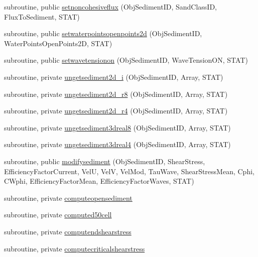 \begin{DoxyCompactItemize}
\item 
subroutine, public \mbox{\hyperlink{namespacemodulesediment_ad60212253ba034e9fe1db4ab0c2c8442}{setnoncohesiveflux}} (Obj\+Sediment\+ID, Sand\+Class\+ID, Flux\+To\+Sediment, S\+T\+AT)
\item 
subroutine, public \mbox{\hyperlink{namespacemodulesediment_a8c48bc8f4d2f029c54181f59654feaa5}{setwaterpointsopenpoints2d}} (Obj\+Sediment\+ID, Water\+Points\+Open\+Points2D, S\+T\+AT)
\item 
subroutine, public \mbox{\hyperlink{namespacemodulesediment_a7549a71a1a07687cb5225c5c8441cb72}{setwavetensionon}} (Obj\+Sediment\+ID, Wave\+Tension\+ON, S\+T\+AT)
\item 
subroutine, private \mbox{\hyperlink{namespacemodulesediment_a12b3d28230917a2bca4471c82f39bdab}{ungetsediment2d\+\_\+i}} (Obj\+Sediment\+ID, Array, S\+T\+AT)
\item 
subroutine, private \mbox{\hyperlink{namespacemodulesediment_aea72603e1507bed2899b17d9e29b67c9}{ungetsediment2d\+\_\+r8}} (Obj\+Sediment\+ID, Array, S\+T\+AT)
\item 
subroutine, private \mbox{\hyperlink{namespacemodulesediment_af3fda7dbc66fbbecc4cf8ca7d4fdf95d}{ungetsediment2d\+\_\+r4}} (Obj\+Sediment\+ID, Array, S\+T\+AT)
\item 
subroutine, private \mbox{\hyperlink{namespacemodulesediment_abf1b5c58352a7fda2565c80929e6e099}{ungetsediment3dreal8}} (Obj\+Sediment\+ID, Array, S\+T\+AT)
\item 
subroutine, private \mbox{\hyperlink{namespacemodulesediment_aa228482586fe3192bde62eb98f474300}{ungetsediment3dreal4}} (Obj\+Sediment\+ID, Array, S\+T\+AT)
\item 
subroutine, public \mbox{\hyperlink{namespacemodulesediment_a8bd56ac218e3c51dd03eb2967d7e9398}{modifysediment}} (Obj\+Sediment\+ID, Shear\+Stress, Efficiency\+Factor\+Current, VelU, VelV, Vel\+Mod, Tau\+Wave, Shear\+Stress\+Mean, Cphi, C\+Wphi, Efficiency\+Factor\+Mean, Efficiency\+Factor\+Waves, S\+T\+AT)
\item 
subroutine, private \mbox{\hyperlink{namespacemodulesediment_a3b7a3bb199cbac91d1df5c84bbd12194}{computeopensediment}}
\item 
subroutine, private \mbox{\hyperlink{namespacemodulesediment_ad32ebe12f24cd2680e47efaeaf5c8e56}{computed50cell}}
\item 
subroutine, private \mbox{\hyperlink{namespacemodulesediment_a9d78e985794a27f527367cd42c5dafb2}{computendshearstress}}
\item 
subroutine, private \mbox{\hyperlink{namespacemodulesediment_a04e890023555f00803b6373c6f8934cc}{computecriticalshearstress}}

\end{DoxyCompactItemize}
